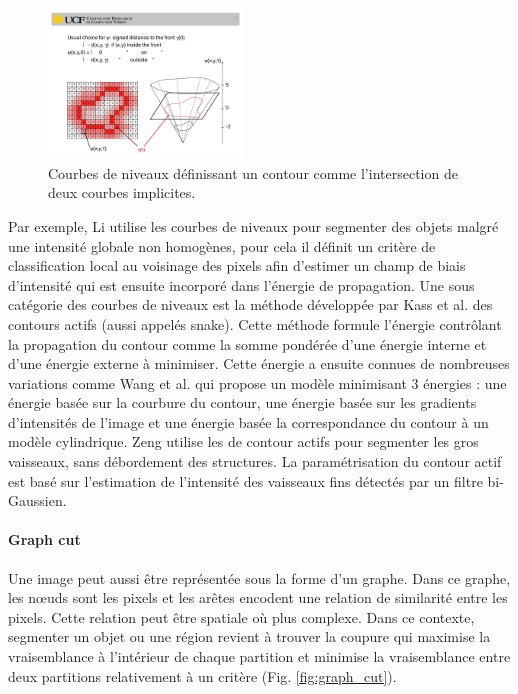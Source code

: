       \begin{figure}[h]
        \centering
        \includegraphics[height=4cm]{Images/level_set_active_contour.jpeg}
        \caption{Courbes de niveaux définissant un contour comme l'intersection de deux courbes implicites.}
        \label{fig:level_set}
      \end{figure}

      Par exemple, Li \cite{Li2011_mri_level_set} utilise les courbes de niveaux pour segmenter des objets malgré une intensité globale non homogènes, pour cela il définit un critère de classification local au voisinage des pixels afin d'estimer un champ de biais d'intensité qui est ensuite incorporé dans l'énergie de propagation. Une sous catégorie des courbes de niveaux est la méthode développée par Kass et al. \cite{Kass1988_snakes} des contours actifs (aussi appelés snake). Cette méthode formule l'énergie contrôlant la propagation du contour comme la somme pondérée d'une énergie interne et d'une énergie externe à minimiser. Cette énergie a ensuite connues de nombreuses variations comme Wang et al. \cite{Wang2012_vessel_level_set} qui propose un modèle minimisant 3 énergies : une énergie basée sur la courbure du contour, une énergie basée sur les gradients d'intensités de l'image et une énergie basée la correspondance du contour à un modèle cylindrique. Zeng \cite{Zeng2018_liver_hybrid_active_contour_region_growing} utilise les de contour actifs pour segmenter les gros vaisseaux, sans débordement des structures. La paramétrisation du contour actif est basé sur l'estimation de l'intensité des vaisseaux fins détectés par un filtre bi-Gaussien.

      \paragraph{Graph cut}
      Une image peut aussi être représentée sous la forme d'un graphe. Dans ce graphe, les nœuds sont les pixels et les arêtes encodent une relation de similarité entre les pixels. Cette relation peut être spatiale où plus complexe. Dans ce contexte, segmenter un objet ou une région revient à trouver la coupure qui maximise la vraisemblance à l'intérieur de chaque partition et minimise la vraisemblance entre deux partitions relativement à un critère (Fig. \ref{fig:graph_cut}).

